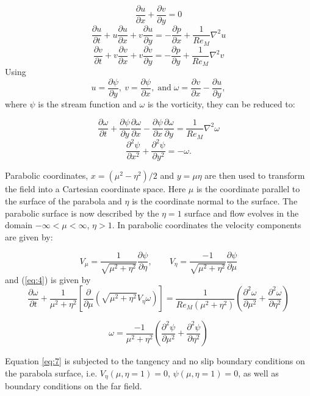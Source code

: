 \documentclass{article}
\newcommand{\pd}{\partial}
\begin{document}
\[
\frac{\pd u}{\pd x} + \frac{\pd v}{\pd y} = 0
\]
\[
\frac{\pd u}{\pd t} + u \frac{\pd u}{\pd x} + v \frac{\pd u}{\pd y} = - \frac{\pd p}{\pd x} + \frac{1}{Re_M} \nabla^2 u
\]
\begin{equation}
\label{eq:1}
\frac{\pd v}{\pd t} + v \frac{\pd v}{\pd x} + v \frac{\pd v}{\pd y} = - \frac{\pd p}{\pd y} + \frac{1}{Re_M} \nabla^2 v
\end{equation}
%
Using
\begin{equation}
\label{eq:2}
u=\frac{\pd \psi}{\pd y},\: v=\frac{\pd \psi}{\pd x},\; \mathrm{and}\; \omega=\frac{\pd v}{\pd x} - \frac{\pd u}{\pd y},
\end{equation}
%
where $\psi$ is the stream function and $\omega$ is the vorticity, they can be reduced to:

\[
\frac{\pd \omega}{\pd t} + \frac{\pd \psi}{\pd y} \frac{\pd \omega}{\pd x} - \frac{\pd \psi}{\pd x} \frac{\pd \omega}{\pd y} = \frac{1}{Re_M} \nabla^2\omega
\]
\begin{equation}
\frac{\pd^2 \psi}{\pd x^2} + \frac{\pd^2 \psi}{\pd y^2} = -\omega.
\label{eq:4}
\end{equation}

Parabolic coordinates, $x=(\mu^2-\eta^2)/2$ and $y=\mu\eta$ are then used to transform the field into a Cartesian coordinate space. Here $\mu$ is the coordinate parallel to the surface of the parabola and $\eta$ is the coordinate normal to the surface. The parabolic surface is now described by the $\eta=1$ surface and flow evolves in the domain $-\infty < \mu < \infty$, $\eta> 1$. In parabolic coordinates the velocity components are given by:

\[
V_\mu=\frac{1}{\sqrt{\mu^2+\eta^2}} \frac{\pd \psi}{\pd \eta}, \quad\quad
V_\eta=\frac{-1}{\sqrt{\mu^2+\eta^2}} \frac{\pd \psi}{\pd \mu}
\]
% 
and (\ref{eq:4}) is given by
\[
\frac{\pd \omega}{\pd t} + \frac{1}{\mu^2 + \eta^2} \left[\frac{\pd}{\pd \mu} \left(\sqrt{\mu^2 + \eta^2} V_\eta \omega \right) \right] = \frac{1}{Re_M(\mu^2 + \eta^2)} \left(\frac{\pd^2 \omega}{\pd \mu^2} + \frac{\pd^2 \omega}{\pd \eta^2} \right)
\]

\begin{equation}
\label{eq:7}
\omega = \frac{-1}{\mu^2 + \eta^2} \left(\frac{\pd^2 \psi}{\pd \mu^2} + \frac{\pd^2 \psi}{\pd \eta^2} \right)
\end{equation}

Equation \ref{eq:7} is subjected to the tangency and no slip boundary conditions on the parabola surface, i.e. $V_\eta(\mu,\eta=1) = 0$, $\psi(\mu,\eta=1) = 0$, as well as boundary conditions on the far field.
\end{document}
